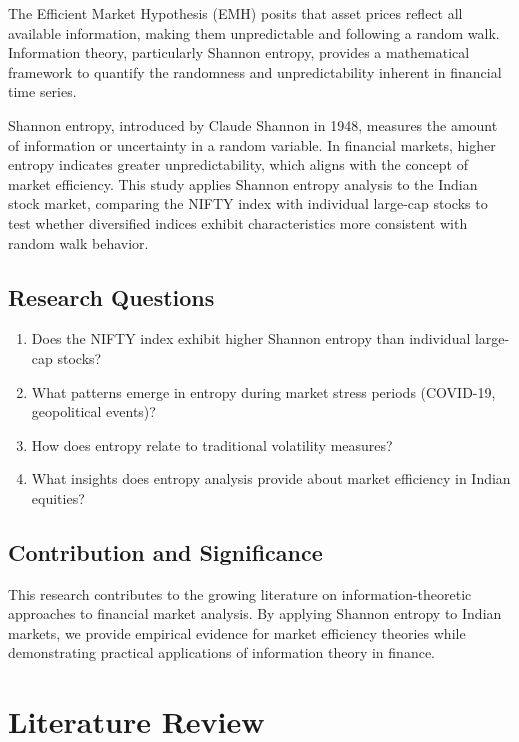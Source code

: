 \documentclass[12pt,a4paper]{article}
\begin{document}
The Efficient Market Hypothesis (EMH) posits that asset prices reflect all available information, making them unpredictable and following a random walk. Information theory, particularly Shannon entropy, provides a mathematical framework to quantify the randomness and unpredictability inherent in financial time series.

Shannon entropy, introduced by Claude Shannon in 1948, measures the amount of information or uncertainty in a random variable. In financial markets, higher entropy indicates greater unpredictability, which aligns with the concept of market efficiency. This study applies Shannon entropy analysis to the Indian stock market, comparing the NIFTY index with individual large-cap stocks to test whether diversified indices exhibit characteristics more consistent with random walk behavior.

\subsection{Research Questions}

\begin{enumerate}
    \item Does the NIFTY index exhibit higher Shannon entropy than individual large-cap stocks?
    \item What patterns emerge in entropy during market stress periods (COVID-19, geopolitical events)?
    \item How does entropy relate to traditional volatility measures?
    \item What insights does entropy analysis provide about market efficiency in Indian equities?
\end{enumerate}

\subsection{Contribution and Significance}

This research contributes to the growing literature on information-theoretic approaches to financial market analysis. By applying Shannon entropy to Indian markets, we provide empirical evidence for market efficiency theories while demonstrating practical applications of information theory in finance.

\section{Literature Review}
\end{document}
